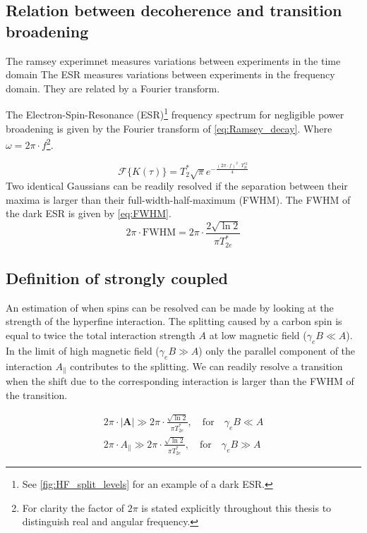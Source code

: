 \subsection{Relation between decoherence and transition broadening}

The ramsey experimnet measures variations between experiments in the time domain
The ESR measures variations between experiments in the frequency domain.
They are related by a Fourier transform.

The Electron-Spin-Resonance (ESR)\footnote{See \cref{fig:HF_split_levels} for an example of a dark ESR.} frequency spectrum for negligible power broadening is given by the Fourier transform of \cref{eq:Ramsey_decay}. Where $\omega = 2\pi \cdot f$\footnote{For clarity the factor of $2\pi$ is stated explicitly throughout this thesis to distinguish real and angular frequency. }.


\begin{equation}
    \mathcal{F} \{ K(\tau) \} =  T_2^* \sqrt{\pi} e^{-\tfrac{(2\pi \cdot f) ^2 \cdot T_{2e}^{*2}}{ 4}}
\end{equation}
Two identical Gaussians can be readily resolved if the separation between their maxima is larger than their full-width-half-maximum (FWHM).
The FWHM of the dark ESR is given by \cref{eq:FWHM}.
\begin{equation}
    2\pi \cdot \mathrm{FWHM} = 2\pi \cdot \frac{2\sqrt{\ln{2}}}{\pi T_{2e}^*}
    \label{eq:FWHM}
\end{equation}

\subsection{Definition of strongly coupled }


An estimation of when spins can be resolved can be made by looking at the strength of the hyperfine interaction.
The splitting caused by a carbon spin is equal to twice the total interaction strength $A$ at low magnetic field ($\gamma_e B \ll A$). In the limit of high magnetic field ($\gamma_e B \gg A$) only the parallel component of the interaction $A_\parallel$ contributes to the splitting.
We can readily resolve a transition when the shift due to the corresponding interaction is larger than the FWHM of the transition.

\begin{align}
     2\pi \cdot |\bm{A}|\gg 2\pi \cdot \frac{\sqrt{\ln{2}}}{\pi T_{2e}^*} , \quad \mathrm{for } \quad \gamma_e B \ll A  \\
     2\pi \cdot A_\parallel \gg 2\pi \cdot \frac{\sqrt{\ln{2}}}{\pi T_{2e}^*}, \quad \mathrm{for } \quad \gamma_e B \gg A
     \label{eq:def_strongly_coupled}
 \end{align}

